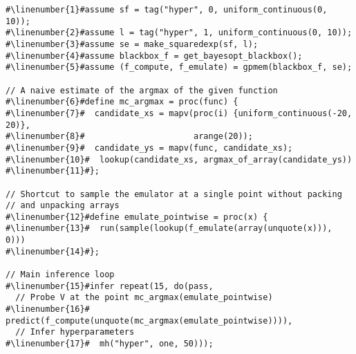 \begin{mdframed}
\begin{minipage}{\linewidth}
\small
\belowcaptionskip=-10pt
\begin{lstlisting}[caption={Bayesian optimization using \gpmem},mathescape,numbers=none,label=alg:bayesopt,escapechar=\#]
#\linenumber{1}#assume sf = tag("hyper", 0, uniform_continuous(0, 10));
#\linenumber{2}#assume l = tag("hyper", 1, uniform_continuous(0, 10));
#\linenumber{3}#assume se = make_squaredexp(sf, l);
#\linenumber{4}#assume blackbox_f = get_bayesopt_blackbox();
#\linenumber{5}#assume (f_compute, f_emulate) = gpmem(blackbox_f, se);

// A naive estimate of the argmax of the given function
#\linenumber{6}#define mc_argmax = proc(func) {
#\linenumber{7}#  candidate_xs = mapv(proc(i) {uniform_continuous(-20, 20)},
#\linenumber{8}#                      arange(20));
#\linenumber{9}#  candidate_ys = mapv(func, candidate_xs);
#\linenumber{10}#  lookup(candidate_xs, argmax_of_array(candidate_ys))
#\linenumber{11}#};

// Shortcut to sample the emulator at a single point without packing
// and unpacking arrays
#\linenumber{12}#define emulate_pointwise = proc(x) {
#\linenumber{13}#  run(sample(lookup(f_emulate(array(unquote(x))), 0)))
#\linenumber{14}#};

// Main inference loop
#\linenumber{15}#infer repeat(15, do(pass,
  // Probe V at the point mc_argmax(emulate_pointwise)
#\linenumber{16}#  predict(f_compute(unquote(mc_argmax(emulate_pointwise)))),
  // Infer hyperparameters
#\linenumber{17}#  mh("hyper", one, 50)));
\end{lstlisting}

\end{minipage}
\end{mdframed}
